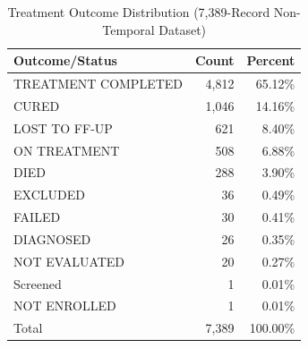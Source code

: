 \begin{table}[htbp]

\caption{Treatment Outcome Distribution (7{,}389-Record Non-Temporal Dataset)}
\label{tab:treatment_outcome_distribution}
\begin{tabular}{lrr}

\toprule

Outcome/Status & Count & Percent \\

\midrule

TREATMENT COMPLETED & 4,812 & 65.12\% \\
CURED & 1,046 & 14.16\% \\
LOST TO FF-UP & 621 & 8.40\% \\
ON TREATMENT & 508 & 6.88\% \\
DIED & 288 & 3.90\% \\
EXCLUDED & 36 & 0.49\% \\
FAILED & 30 & 0.41\% \\
DIAGNOSED & 26 & 0.35\% \\
NOT EVALUATED & 20 & 0.27\% \\
Screened & 1 & 0.01\% \\
NOT ENROLLED & 1 & 0.01\% \\

\midrule

Total & 7,389 & 100.00\% \\

\bottomrule

\end{tabular}

\end{table}
